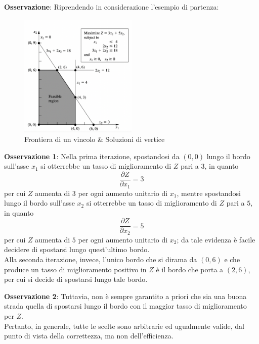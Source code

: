 \documentclass[a4paper]{extarticle}
\begin{document}
\vspace{1em}
\noindent
\textbf{Osservazione}: Riprendendo in considerazione l'esempio di partenza:

\begin{figure}[H]
    \centering
    \includegraphics[width=0.5\textwidth]{Frontiera_vincolo_soluzioni_vertice}
    \caption{Frontiera di un vincolo \& Soluzioni di vertice}
    \label{fig:fig1_3}
\end{figure}

\vspace{1em}
\noindent
\textbf{Osservazione 1}: Nella prima iterazione, spostandosi da $(0,0)$ lungo il bordo sull'asse $x_1$ si otterrebbe un tasso di miglioramento di $Z$ pari a $3$, in quanto
\[\frac{\partial Z}{\partial x_1} = 3\]
per cui $Z$ aumenta di $3$ per ogni aumento unitario di $x_1$, mentre spostandosi lungo il bordo sull'asse $x_2$ si otterrebbe un tasso di miglioramento di $Z$ pari a $5$, in quanto
\[\frac{\partial Z}{\partial x_2} = 5\]
per cui $Z$ aumenta di $5$ per ogni aumento unitario di $x_2$; da tale evidenza è facile decidere di spostarsi lungo quest'ultimo bordo.\\
Alla seconda iterazione, invece, l'unico bordo che si dirama da $(0,6)$ e che produce un tasso di miglioramento positivo in $Z$ è il bordo che porta a $(2,6)$, per cui si decide di spostarsi lungo tale bordo.

\vspace{1em}
\noindent
\textbf{Osservazione 2}: Tuttavia, non è sempre garantito a priori che sia una buona strada quella di spostarsi lungo il bordo con il maggior tasso di miglioramento per $Z$.\\
Pertanto, in generale, tutte le scelte sono arbitrarie ed ugualmente valide, dal punto di vista della correttezza, ma non dell'efficienza.

\vspace{1em}
\end{document}

